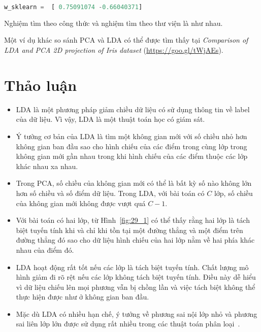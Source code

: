 \begin{lstlisting}[language=Python]
w_sklearn =  [ 0.75091074 -0.66040371]
\end{lstlisting}
 
Nghiệm tìm theo công thức và nghiệm tìm theo thư viện là như nhau. 
 
Một ví dụ khác so sánh PCA và LDA có thể được tìm thấy tại \textit{Comparison of LDA
and PCA 2D projection of Iris dataset} (\url{https://goo.gl/tWjAEs}). 
 
\newpage
\section{Thảo luận}

\begin{itemize}
    \item LDA là một phương pháp giảm chiều dữ liệu có sử dụng thông tin về
    label của dữ liệu. Vì vậy, LDA là một thuật toán học có giám sát. 
     
    \item Ý tưởng cơ bản của LDA là tìm một không gian mới với số chiều nhỏ hơn
    không gian ban đầu sao cho hình chiếu của các điểm trong cùng lớp trong không gian mới gần nhau trong khi hình chiếu của các điểm thuộc các lớp khác
    nhau xa nhau. 
     
    \item Trong PCA, số chiều của không gian mới có thể là bất kỳ số nào không lớn hơn số chiều và số điểm dữ liệu. Trong LDA, với bài toán có $C$
    lớp, số chiều của không gian mới không được vượt quá $C-1$.
     
    \item Với bài toán có hai lớp, từ Hình~\ref{fig:29_1} có thể thấy rằng
    hai lớp
    là tách biệt tuyến tính khi và chỉ khi tồn tại một đường thẳng và một điểm
    trên đường thẳng đó sao cho dữ liệu hình chiếu của hai lớp nằm về hai phía khác nhau của điểm đó.
     
    \item LDA hoạt động rất tốt nếu các lớp là tách biệt tuyến tính. Chất lượng mô
    hình giảm đi rõ rệt nếu các lớp không tách biệt tuyến tính. Điều này dễ
    hiểu vì dữ liệu chiếu lên mọi phương vẫn bị chồng lần và việc
    tách biệt không thể thực hiện được như ở không gian ban đầu.
     
    \item Mặc dù LDA có nhiều hạn chế, ý tưởng về phương sai nội lớp nhỏ và phương sai liên lớp lớn được sử dụng rất nhiều trong các
    thuật toán phân loại~\cite{vu2016fast,vu2016learning,Meng2011FDDL}.
 
\end{itemize}
 
